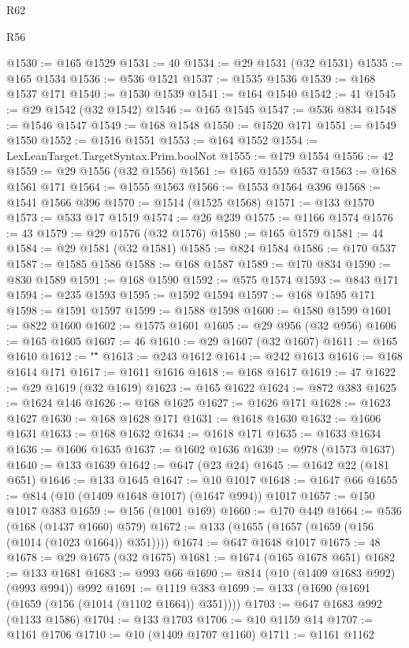 \begin{lexlean}{R62}
\begin{lexlean}{R56}
\begin{coremodule}
{{{{{{{{{{{{{{{{{{{{{{{{{{{{{{{{{{{{{{{{{{{{{{{{{{{{{{{{{{{{{{{{{{{{{{{{{{{{{{{{{{{{{{{{{{{{{{{{{{{{{{{{{{{{{{{{{{{{{{{{{{{{{{{{{{{{{{{{{{{{{{{{{{{{{{{{{{{{{{{{{{{{{{{{{{{{{{{{{{{{{{{{{{{{{{{{{{{{{{{{{{{{{{{{{{{@1530 := @165 @1529
@1531 := 40
@1534 := @29 @1531 (@32 @1531)
@1535 := @165 @1534
@1536 := @536 @1521
@1537 := @1535 @1536
@1539 := @168 @1537 @171
@1540 := @1530 @1539
@1541 := @164 @1540
@1542 := 41
@1545 := @29 @1542 (@32 @1542)
@1546 := @165 @1545
@1547 := @536 @834
@1548 := @1546 @1547
@1549 := @168 @1548
@1550 := @1520 @171
@1551 := @1549 @1550
@1552 := @1516 @1551
@1553 := @164 @1552
@1554 := LexLeanTarget.TargetSyntax.Prim.boolNot
@1555 := @179 @1554
@1556 := 42
@1559 := @29 @1556 (@32 @1556)
@1561 := @165 @1559 @537
@1563 := @168 @1561 @171
@1564 := @1555 @1563
@1566 := @1553 @1564 @396
@1568 := @1541 @1566 @396
@1570 := @1514 (@1525 @1568)
@1571 := @133 @1570
@1573 := @533 @17 @1519
@1574 := @26 @239
@1575 := @1166 @1574
@1576 := 43
@1579 := @29 @1576 (@32 @1576)
@1580 := @165 @1579
@1581 := 44
@1584 := @29 @1581 (@32 @1581)
@1585 := @824 @1584
@1586 := @170 @537
@1587 := @1585 @1586
@1588 := @168 @1587
@1589 := @170 @834
@1590 := @830 @1589
@1591 := @168 @1590
@1592 := @575 @1574
@1593 := @843 @171
@1594 := @235 @1593
@1595 := @1592 @1594
@1597 := @168 @1595 @171
@1598 := @1591 @1597
@1599 := @1588 @1598
@1600 := @1580 @1599
@1601 := @822 @1600
@1602 := @1575 @1601
@1605 := @29 @956 (@32 @956)
@1606 := @165 @1605
@1607 := 46
@1610 := @29 @1607 (@32 @1607)
@1611 := @165 @1610
@1612 := "\""
@1613 := @243 @1612
@1614 := @242 @1613
@1616 := @168 @1614 @171
@1617 := @1611 @1616
@1618 := @168 @1617
@1619 := 47
@1622 := @29 @1619 (@32 @1619)
@1623 := @165 @1622
@1624 := @872 @383
@1625 := @1624 @146
@1626 := @168 @1625
@1627 := @1626 @171
@1628 := @1623 @1627
@1630 := @168 @1628 @171
@1631 := @1618 @1630
@1632 := @1606 @1631
@1633 := @168 @1632
@1634 := @1618 @171
@1635 := @1633 @1634
@1636 := @1606 @1635
@1637 := @1602 @1636
@1639 := @978 (@1573 @1637)
@1640 := @133 @1639
@1642 := @647 (@23 @24)
@1645 := @1642 @22 (@181 @651)
@1646 := @133 @1645
@1647 := @10 @1017
@1648 := @1647 @66
@1655 := @814 (@10 (@1409 @1648 @1017) (@1647 @994)) @1017
@1657 := @150 @1017 @383
@1659 := @156 (@1001 @169)
@1660 := @170 @449
@1664 := @536 (@168 (@1437 @1660) @579)
@1672 := @133 (@1655 (@1657 (@1659 (@156 (@1014 (@1023 @1664)) @351))))
@1674 := @647 @1648 @1017
@1675 := 48
@1678 := @29 @1675 (@32 @1675)
@1681 := @1674 (@165 @1678 @651)
@1682 := @133 @1681
@1683 := @993 @66
@1690 := @814 (@10 (@1409 @1683 @992) (@993 @994)) @992
@1691 := @1119 @383
@1699 := @133 (@1690 (@1691 (@1659 (@156 (@1014 (@1102 @1664)) @351))))
@1703 := @647 @1683 @992 (@1133 @1586)
@1704 := @133 @1703
@1706 := @10 @1159 @14
@1707 := @1161 @1706
@1710 := @10 (@1409 @1707 @1160)
@1711 := @1161 @1162
}}}}}}}}}}}}}}}}}}}}}}}}}}}}}}}}}}}}}}}}}}}}}}}}}}}}}}}}}}}}}}}}}}}}}}}}}}}}}}}}}}}}}}}}}}}}}}}}}}}}}}}}}}}}}}}}}}}}}}}}}}}}}}}}}}}}}}}}}}}}}}}}}}}}}}}}}}}}}}}}}}}}}}}}}}}}}}}}}}}}}}}}}}}}}}}}}}}}}}}}}}}}}}}}}}}
\end{coremodule}
\end{lexlean}
\end{lexlean}
